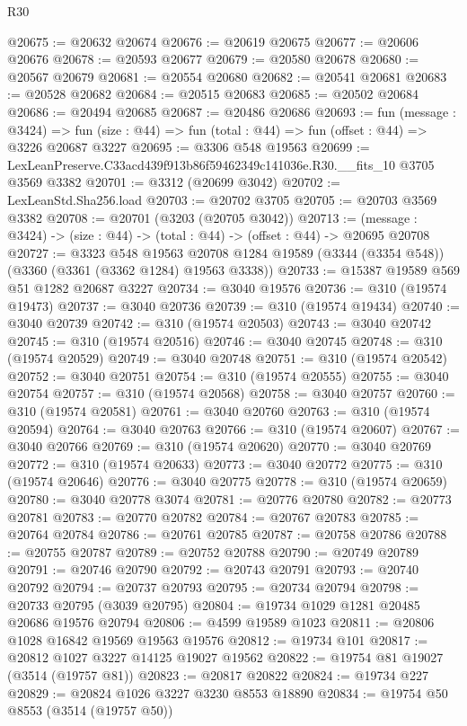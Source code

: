 \begin{lexlean}{R30}
\begin{coremodule}
@20675 := @20632 @20674
@20676 := @20619 @20675
@20677 := @20606 @20676
@20678 := @20593 @20677
@20679 := @20580 @20678
@20680 := @20567 @20679
@20681 := @20554 @20680
@20682 := @20541 @20681
@20683 := @20528 @20682
@20684 := @20515 @20683
@20685 := @20502 @20684
@20686 := @20494 @20685
@20687 := @20486 @20686
@20693 := fun (message : @3424) =>
  fun (size : @44) => fun (total : @44) => fun (offset : @44) => @3226 @20687 @3227
@20695 := @3306 @548 @19563
@20699 := LexLeanPreserve.C33acd439f913b86f59462349c141036e.R30.__fits_10 @3705 @3569 @3382
@20701 := @3312 (@20699 @3042)
@20702 := LexLeanStd.Sha256.load
@20703 := @20702 @3705
@20705 := @20703 @3569 @3382
@20708 := @20701 (@3203 (@20705 @3042))
@20713 := (message : @3424) -> (size : @44) -> (total : @44) -> (offset : @44) -> @20695 @20708
@20727 := @3323
    @548
    @19563
    @20708
    @1284
    @19589
    (@3344 (@3354 @548))
    (@3360 (@3361 (@3362 @1284) @19563 @3338))
@20733 := @15387 @19589 @569 @51 @1282 @20687 @3227
@20734 := @3040 @19576
@20736 := @310 (@19574 @19473)
@20737 := @3040 @20736
@20739 := @310 (@19574 @19434)
@20740 := @3040 @20739
@20742 := @310 (@19574 @20503)
@20743 := @3040 @20742
@20745 := @310 (@19574 @20516)
@20746 := @3040 @20745
@20748 := @310 (@19574 @20529)
@20749 := @3040 @20748
@20751 := @310 (@19574 @20542)
@20752 := @3040 @20751
@20754 := @310 (@19574 @20555)
@20755 := @3040 @20754
@20757 := @310 (@19574 @20568)
@20758 := @3040 @20757
@20760 := @310 (@19574 @20581)
@20761 := @3040 @20760
@20763 := @310 (@19574 @20594)
@20764 := @3040 @20763
@20766 := @310 (@19574 @20607)
@20767 := @3040 @20766
@20769 := @310 (@19574 @20620)
@20770 := @3040 @20769
@20772 := @310 (@19574 @20633)
@20773 := @3040 @20772
@20775 := @310 (@19574 @20646)
@20776 := @3040 @20775
@20778 := @310 (@19574 @20659)
@20780 := @3040 @20778 @3074
@20781 := @20776 @20780
@20782 := @20773 @20781
@20783 := @20770 @20782
@20784 := @20767 @20783
@20785 := @20764 @20784
@20786 := @20761 @20785
@20787 := @20758 @20786
@20788 := @20755 @20787
@20789 := @20752 @20788
@20790 := @20749 @20789
@20791 := @20746 @20790
@20792 := @20743 @20791
@20793 := @20740 @20792
@20794 := @20737 @20793
@20795 := @20734 @20794
@20798 := @20733 @20795 (@3039 @20795)
@20804 := @19734 @1029 @1281 @20485 @20686 @19576 @20794
@20806 := @4599 @19589 @1023
@20811 := @20806 @1028 @16842 @19569 @19563 @19576
@20812 := @19734 @101
@20817 := @20812 @1027 @3227 @14125 @19027 @19562
@20822 := @19754 @81 @19027 (@3514 (@19757 @81))
@20823 := @20817 @20822
@20824 := @19734 @227
@20829 := @20824 @1026 @3227 @3230 @8553 @18890
@20834 := @19754 @50 @8553 (@3514 (@19757 @50))

\end{coremodule}
\end{lexlean}

